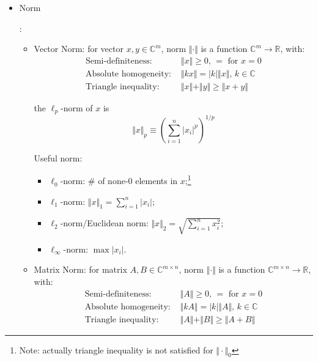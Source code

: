 \begin{itemize}[topsep=6pt,itemsep=4pt]
        \item \hypertarget{NormDefinition}{Norm}: 
        \begin{itemize}[topsep=2pt,itemsep=0pt]
            \item Vector Norm: for vector $ x,y\in \mathbb{C}^m $, norm $ \Vert \cdot \Vert  $ is a function $ \mathbb{C}^m\to \mathbb{R} $, with:
            \begin{align*}
                \text{Semi-definiteness: }&\Vert x \Vert \geq 0,\, =\text{ for }x=0\\
                \text{Absolute homogeneity: }&\Vert kx \Vert = |k|\Vert x \Vert,\, k\in \mathbb{C} \\
                \text{Triangle inequality: }& \Vert x \Vert + \Vert y \Vert \geq \Vert x+y \Vert 
            \end{align*}
        
        
        the $ \ell_p $-norm of $ x $ is
        \begin{equation}
            \Vert x\Vert _p\equiv \left( \sum_{i=1}^n| x_i|^p \right)^{1/p}
        \end{equation}

        Useful norm:
        \begin{itemize}[topsep=2pt,itemsep=2pt]
            \item $ \ell_0$-norm: \# of none-0 elements in $ x $;\footnote{Note: actually triangle inequality is not satisfied for $ \Vert \cdot \Vert _0 $}
            \item $ \ell_1 $-norm: $ \Vert x\Vert _1=\sum_{i=1}^n|x_i| $;
            \item $ \ell_2 $-norm/Euclidean norm: $ \Vert x\Vert _2=\sqrt{\sum_{i=1}^n x_i^2}  $;
            \item $ \ell_\infty $-norm: $ \max |x_i| $.
        \end{itemize}
        \item Matrix Norm:  for matrix $ A,B\in \mathbb{C}^{m\times n} $, norm $ \Vert \cdot \Vert  $ is a function $ \mathbb{C}^{m\times n}\to \mathbb{R} $, with:
        \begin{align*}
            \text{Semi-definiteness: }&\Vert A \Vert \geq 0,\, =\text{ for }x=0\\
            \text{Absolute homogeneity: }&\Vert kA \Vert = |k|\Vert A \Vert,\, k\in \mathbb{C} \\
            \text{Triangle inequality: }& \Vert A \Vert + \Vert B \Vert \geq \Vert A+B \Vert 
        \end{align*}


\end{itemize}
\end{itemize}
